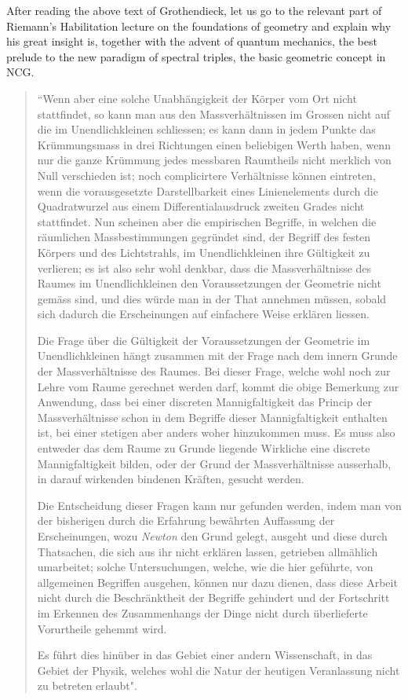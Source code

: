 \documentclass[12pt]{article}
\begin{document}
After reading the above text of Grothendieck, let us go to the relevant part of Riemann's Habilitation lecture on the foundations of geometry and explain why his great insight is, together with the advent of quantum mechanics, the best prelude  to the new paradigm of spectral triples, the basic geometric concept in NCG.

{\em

\begin{quote}  ``Wenn
aber eine solche Unabh\"{a}ngigkeit der K\"{o}rper vom Ort nicht
stattfindet, so kann man aus den Massverh\"{a}ltnissen im Grossen
nicht auf die im Unendlichkleinen schliessen; es kann dann in
jedem Punkte das Kr\"{u}mmungsmass in drei Richtungen einen
beliebigen Werth haben, wenn nur die ganze Kr\"{u}mmung jedes
messbaren Raumtheils nicht merklich von Null verschieden ist; noch
complicirtere Verh\"{a}ltnisse k\"{o}nnen eintreten, wenn die
vorausgesetzte Darstellbarkeit eines Linienelements durch die
Quadratwurzel aus einem Differentialausdruck zweiten Grades nicht
stattfindet. {\color{red} Nun scheinen aber die empirischen Begriffe, in
welchen die r\"{a}umlichen Massbestimmungen gegr\"{u}ndet sind,
der Begriff des festen K\"{o}rpers und des Lichtstrahls, im
Unendlichkleinen ihre G\"{u}ltigkeit zu verlieren; es ist also
sehr wohl denkbar, dass die Massverh\"{a}ltnisse des Raumes im
Unendlichkleinen den Voraussetzungen der Geometrie nicht
gem\"{a}ss sind, und dies w\"{u}rde man in der That annehmen
m\"{u}ssen, sobald sich dadurch die Erscheinungen auf einfachere
Weise erkl\"{a}ren liessen.}

Die Frage \"{u}ber die G\"{u}ltigkeit der Voraussetzungen der
Geometrie im Unendlichkleinen h\"{a}ngt zusammen mit der Frage
nach dem innern Grunde der Massverh\"{a}ltnisse des Raumes.  Bei
dieser Frage, welche wohl noch zur Lehre vom Raume gerechnet
werden darf, kommt die obige Bemerkung zur Anwendung, dass bei
einer discreten Mannigfaltigkeit das Princip der
Massverh\"{a}ltnisse schon in dem Begriffe dieser
Mannigfaltigkeit enthalten ist, bei einer stetigen aber anders
woher hinzukommen muss.  {\color{red} Es muss also entweder das dem Raume zu
Grunde liegende Wirkliche eine discrete Mannigfaltigkeit bilden,
oder der Grund der Massverh\"{a}ltnisse ausserhalb, in darauf
wirkenden bindenen Kr\"{a}ften, gesucht werden.}

Die Entscheidung dieser Fragen kann nur gefunden werden, indem
man von der bisherigen durch die Erfahrung bew\"{a}hrten
Auffassung der Erscheinungen, wozu \emph{Newton} den Grund
gelegt, ausgeht und diese durch Thatsachen, die sich aus ihr
nicht erkl\"{a}ren lassen, getrieben allm\"{a}hlich umarbeitet;
solche Untersuchungen, welche, wie die hier gef\"{u}hrte, von
allgemeinen Begriffen ausgehen, k\"{o}nnen nur dazu dienen, dass
diese Arbeit nicht durch die Beschr\"{a}nktheit der Begriffe
gehindert und der Fortschritt im Erkennen des Zusammenhangs der
Dinge nicht durch \"{u}berlieferte Vorurtheile gehemmt wird.

Es f\"{u}hrt dies hin\"{u}ber in das Gebiet einer andern
Wissenschaft, in das Gebiet der Physik, welches wohl die Natur
der heutigen Veranlassung nicht zu betreten erlaubt".\end{quote}}
\end{document}
